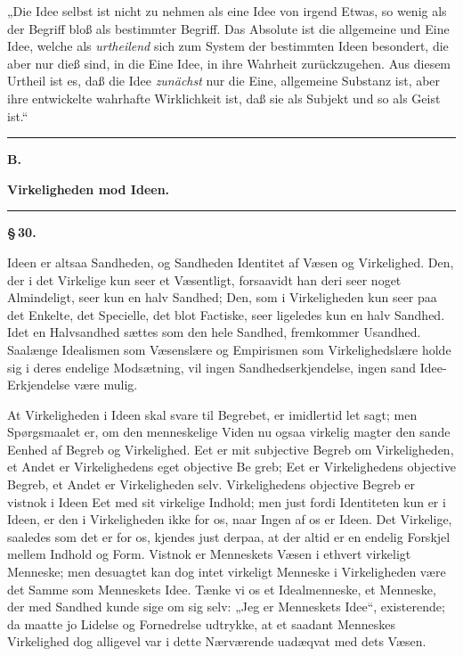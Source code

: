 \documentclass[12pt]{book}
\newcommand{\opage}[1]{\marginnote{\footnotesize\textit{[#1]}}}
\begin{document}
\opage{158} „Die Idee selbst ist nicht zu nehmen als eine Idee von irgend Etwas, so wenig als der Begriff bloß
als bestimmter Begriff. Das Absolute ist die allgemeine und Eine Idee, welche als \emph{urtheilend}
sich zum System der bestimmten Ideen besondert, die aber nur dieß sind, in die Eine Idee, in ihre
Wahrheit zurückzugehen. Aus diesem Urtheil ist es, daß die Idee \emph{zunächst} nur die Eine,
allgemeine Substanz ist, aber ihre entwickelte wahrhafte Wirklichkeit ist, daß sie als Subjekt und
so als Geist ist.“

\begin{center}\rule{0.35\linewidth}{0.4pt}\end{center}

\begin{center}
  {\large\bfseries B.}\par\vspace{2pt}
  {\bfseries Virkeligheden mod Ideen.}\par\vspace{4pt}
  \rule{2cm}{0.4pt}
\end{center}
{}

\begin{center}{\bfseries \S\,30.}\end{center}

Ideen er altsaa Sandheden, og Sandheden Identitet af Væsen og Virkelighed. Den, der i det
Virkelige kun seer et Væsentligt, forsaavidt han deri seer noget Almindeligt, seer kun en halv
Sandhed; Den, som i Virkeligheden kun seer paa det Enkelte, det Specielle, det blot Factiske, seer
ligeledes kun en halv Sandhed. Idet en Halvsandhed sættes som den hele Sandhed, fremkommer
Usandhed. Saalænge Idealismen som Væsenslære og Empirismen som Virkelighedslære holde sig i deres
endelige Modsætning, vil ingen Sandhedserkjendelse, ingen sand Idee-Erkjendelse være mulig.

At Virkeligheden i Ideen skal svare til Begrebet, er imidlertid let sagt; men Spørgsmaalet er, om
den menneskelige Viden nu ogsaa virkelig magter den sande Eenhed af Begreb og Virkelighed. Eet er
mit subjective Begreb om Virkeligheden, et Andet er Virkelighedens eget objective Be%
\opage{159}greb; Eet er Virkelighedens objective Begreb, et Andet er Virkeligheden selv. Virkelighedens
objective Begreb er vistnok i Ideen Eet med sit virkelige Indhold; men just fordi
Identiteten kun er i Ideen, er den i Virkeligheden ikke for os, naar Ingen af os er Ideen. Det
Virkelige, saaledes som det er for os, kjendes just derpaa, at der altid er en endelig Forskjel
mellem Indhold og Form. Vistnok er Menneskets Væsen i ethvert virkeligt Menneske; men desuagtet
kan dog intet virkeligt Menneske i Virkeligheden være det Samme som Menneskets Idee. Tænke vi os
et Idealmenneske, et Menneske, der med Sandhed kunde sige om sig selv: „Jeg er Menneskets Idee“,
existerende; da maatte jo Lidelse og Fornedrelse udtrykke, at et saadant Menneskes Virkelighed dog
alligevel var i dette Nærværende uadæqvat med dets Væsen.
\end{document}
